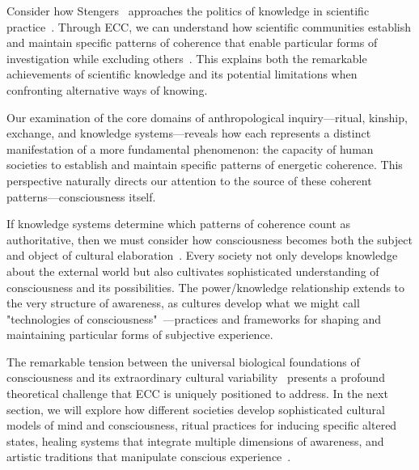 Consider how Stengers~\cite{stengers2010cosmopolitics} approaches the politics of knowledge in scientific practice~\cite{latour1999pandora}. Through ECC, we can understand how scientific communities establish and maintain specific patterns of coherence that enable particular forms of investigation while excluding others~. This explains both the remarkable achievements of scientific knowledge and its potential limitations when confronting alternative ways of knowing.

Our examination of the core domains of anthropological inquiry—ritual, kinship, exchange, and knowledge systems—reveals how each represents a distinct manifestation of a more fundamental phenomenon: the capacity of human societies to establish and maintain specific patterns of energetic coherence. This perspective naturally directs our attention to the source of these coherent patterns—consciousness itself.

If knowledge systems determine which patterns of coherence count as authoritative, then we must consider how consciousness becomes both the subject and object of cultural elaboration~\cite{csordas1994embodiment,kohn2013how}. Every society not only develops knowledge about the external world but also cultivates sophisticated understanding of consciousness and its possibilities. The power/knowledge relationship extends to the very structure of awareness, as cultures develop what we might call "technologies of consciousness"~\cite{desjarlais1992body}—practices and frameworks for shaping and maintaining particular forms of subjective experience.

The remarkable tension between the universal biological foundations of consciousness and its extraordinary cultural variability~ presents a profound theoretical challenge that ECC is uniquely positioned to address. In the next section, we will explore how different societies develop sophisticated cultural models of mind and consciousness, ritual practices for inducing specific altered states, healing systems that integrate multiple dimensions of awareness, and artistic traditions that manipulate conscious experience~\cite{kohn2013how,howes2003sensual,jackson1989knowledge}.
